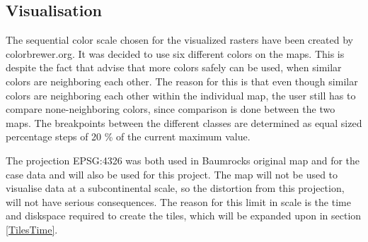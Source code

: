\subsection{Visualisation}
The sequential color scale chosen for the visualized rasters have been created by colorbrewer.org. It was decided to use six different colors on the maps. This is despite the fact that \citet{ColorBrewerwebsite} advise that more colors safely can be used, when similar colors are neighboring each other. The reason for this is that even though similar colors are neighboring each other within the individual map, the user still has to compare none-neighboring colors, since comparison is done between the two maps. The breakpoints between the different classes are determined as equal sized percentage steps of 20 \% of the current maximum value.  

The projection EPSG:4326 was both used in Baumrocks original map and for the case data and will also be used for this project. The map will not be used to visualise data at a subcontinental scale, so the distortion from this projection, will not have serious consequences. The reason for this limit in scale is the time and diskspace required to create the tiles, which will be expanded upon in section \ref{TilesTime}.
